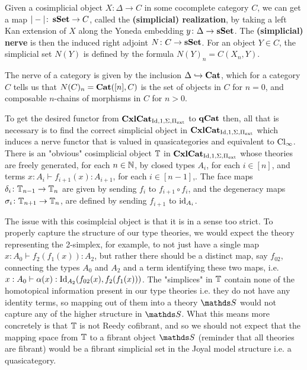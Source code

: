 \documentclass{amsart}
\begin{document}
\begin{defn}
    Given a cosimplicial object $X\colon\Delta\to C$ in some cocomplete category $C$, we can get a map $|-|\colon\operatorname{\mathbf{sSet}}\to C$, called the \textbf{(simplicial) realization}, by taking a left Kan extension of $X$ along the Yoneda embedding $y\colon\Delta\to\operatorname{\mathbf{sSet}}$. The \textbf{(simplicial) nerve} is then the induced right adjoint $N\colon C\to\operatorname{\mathbf{sSet}}$. For an object $Y\in C$, the simplicial set $N(Y)$ is defined by the formula $N(Y)_n=C(X_n,Y)$.
\end{defn}

\begin{ex}
    The nerve of a category is given by the inclusion $\Delta\hookrightarrow\operatorname{\mathbf{Cat}}$, which for a category $C$ tells us that $N(C)_n=\operatorname{\mathbf{Cat}}([n],C)$ is the set of objects in $C$ for $n=0$, and composable $n$-chains of morphisms in $C$ for $n>0$.
\end{ex}

To get the desired functor from $\operatorname{\mathbf{CxlCat}}_{\operatorname{Id},1,\Sigma,\Pi_{\operatorname{ext}}}$ to $\operatorname{\mathbf{qCat}}$ then, all that is necessary is to find the correct simplicial object in $\operatorname{\mathbf{CxlCat}}_{\operatorname{Id},1,\Sigma,\Pi_{\operatorname{ext}}}$ which induces a nerve functor that is valued in quasicategories and equivalent to $\operatorname{Cl}_\infty$. There is an "obvious" cosimplicial object $\mathbb{T}$ in $\operatorname{\mathbf{CxlCat}}_{\operatorname{Id},1,\Sigma,\Pi_{\operatorname{ext}}}$ whose theories are freely generated, for each $n\in\mathbb{N}$, by closed types $A_i$, for each $i\in[n]$, and terms $x:A_i\vdash f_{i+1}(x):A_{i+1}$, for each $i\in[n-1]$,. The face maps $\delta_i\colon\mathbb{T}_{n-1}\to\mathbb{T}_n$ are given by sending $f_i$ to $f_{i+1}\circ f_i$, and the degeneracy maps $\sigma_i\colon\mathbb{T}_{n+1}\to\mathbb{T}_n$, are defined by sending $f_{i+1}$ to $\operatorname{id}_{A_i}$.

The issue with this cosimplcial object is that it is in a sense too strict. To properly capture the structure of our type theories, we would expect the theory representing the 2-simplex, for example, to not just have a single map $x:A_0\vdash f_2(f_1(x)):A_2$, but rather there should be a distinct map, say $f_{02}$, connecting the types $A_0$ and $A_2$ and a term identifying these two maps, i.e. $x:A_0\vdash\alpha(x):\operatorname{Id}_{A_2}(f_{02}(x),f_2(f_1(x)))$. The "simplices" in $\mathbb{T}$ contain none of the homotopical information present in our type theories i.e. they do not have any identity terms, so mapping out of them into a theory $\bS$ would not capture any of the higher structure in $\bS$. What this means more concretely is that $\mathbb{T}$ is not Reedy cofibrant, and so we should not expect that the mapping space from $\mathbb{T}$ to a fibrant object $\bS$ (reminder that all theories are fibrant) would be a fibrant simplicial set in the Joyal model structure i.e. a quasicategory.
\end{document}
